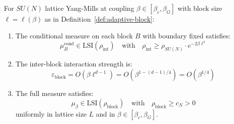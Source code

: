 \begin{theorem}
\label{thm:block-zeg-app76}
For $SU(N)$ lattice Yang-Mills at coupling $\beta \in [\beta_c, \beta_G]$ with 
block size $\ell = \ell(\beta)$ as in Definition~\ref{def:adaptive-block}:
\begin{enumerate}[label=(\roman*)]
\item The conditional measure on each block $B$ with boundary fixed satisfies:
\[
\mu_B^{\text{cond}} \in \mathrm{LSI}(\rho_{\text{int}}) \quad \text{with} \quad 
\rho_{\text{int}} \geq \rho_{SU(N)} \cdot e^{-2\beta \ell^4}
\]
\item The inter-block interaction strength is:
\[
\varepsilon_{\text{block}} = O(\beta \ell^{d-1}) = O(\beta^{1 - (d-1)/4}) = O(\beta^{1/4})
\]
\item The full measure satisfies:
\[
\mu_\beta \in \mathrm{LSI}(\rho_{\text{block}}) \quad \text{with} \quad 
\rho_{\text{block}} \geq c_N > 0
\]
uniformly in lattice size $L$ and in $\beta \in [\beta_c, \beta_G]$.
\end{enumerate}
\end{theorem}

